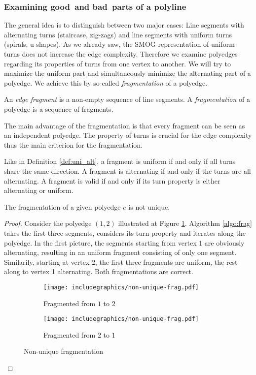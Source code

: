 \subsubsection*{Examining \grqq good\grqq~and \grqq bad\grqq~parts of a polyline}
The general idea is to distinguish between two major cases: Line segments with alternating turns (staircase, zig-zags) and line segments with uniform turns (spirals, u-shapes). As we already saw, the SMOG representation of uniform turns does not increase the edge complexity. Therefore we examine polyedges regarding its properties of turns from one vertex to another. We will try to maximize the uniform part and simultaneously minimize the alternating part of a polyedge. We achieve this by so-called \textit{fragmentation} of a polyedge.
\begin{definition}
	An \textit{edge fragment} is a non-empty sequence of line segments. A \textit{fragmentation} of a polyedge is a sequence of fragments.
\end{definition}
The main advantage of the fragmentation is that every fragment can be seen as an independent polyedge.
The property of turns is crucial for the edge complexity thus the main criterion for the fragmentation.
\begin{definition}
	Like in Definition \ref{def:uni_alt}, a fragment is uniform if and only if all turns share the same direction. A fragment is alternating if and only if the turns are all alternating. A fragment is valid if and only if its turn property is either alternating or uniform.
\end{definition}
\begin{lemma} The fragmentation of a given polyedge $e$ is not unique.
\end{lemma}
\begin{proof}
	Consider the polyedge $(1,2)$ illustrated at Figure \ref{im:nonunique}. Algorithm \ref{algo:frag} takes the first three segments, considers its turn property and iterates along the polyedge. In the first picture, the segments starting from vertex 1 are obviously alternating, resulting in an uniform fragment consisting of only one segment. Similarily, starting at vertex 2, the first three fragments are uniform, the rest along to vertex 1 alternating. Both fragmentations are correct.
	\begin{figure}[H]
		\centering
		\begin{subfigure}{0.4\textwidth}
			\centering
			\texttt{[image: includegraphics/non-unique-frag.pdf]}
			\caption{Fragmented from $1$ to $2$}
		\end{subfigure}
		\begin{subfigure}{0.4\textwidth}
			\centering
			\texttt{[image: includegraphics/non-unique-frag.pdf]}
			\caption{Fragmented from $2$ to $1$}
		\end{subfigure}
		\caption{Non-unique fragmentation}\label{im:nonunique}
	\end{figure}
\end{proof}
